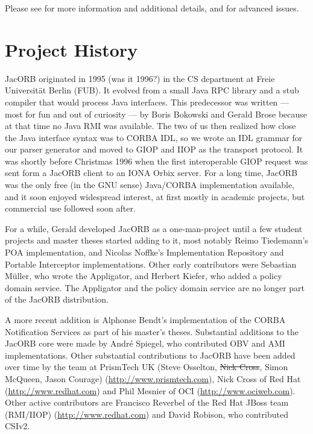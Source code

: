 Please see \cite{Brose2001a,Siegel2000, Vinoski1997} for more
information and additional details, and \cite{Henning1999} for
advanced issues.

\section{Project History}

JacORB originated in 1995 (was it 1996?) in the CS department at Freie
Universit{\"a}t Berlin (FUB). It evolved from a small Java RPC library and a
stub compiler that would process Java interfaces. This predecessor was
written --- most for fun and out of curiosity --- by Boris Bokowski
and Gerald Brose because at that time no Java RMI was available. The
two of us then realized how close the Java interface syntax was to
CORBA IDL, so we wrote an IDL grammar for our parser generator and
moved to GIOP and IIOP as the transport protocol. It was shortly
before Christmas 1996 when the first interoperable GIOP request was
sent form a JacORB client to an IONA Orbix server. For a long time,
JacORB was the only free (in the GNU sense) Java/CORBA implementation
available, and it soon enjoyed widespread interest, at first mostly in
academic projects, but commercial use followed soon after.

For a while, Gerald developed JacORB as a one-man-project until a few
student projects and master theses started adding to it, most notably
Reimo Tiedemann's POA implementation, and Nicolas Noffke's
Implementation Repository and Portable Interceptor implementations.
Other early contributors were Sebastian M{\"u}ller, who wrote the
Appligator, and Herbert Kiefer, who added a policy domain service. The
Appligator and the policy domain service are no longer part of the
JacORB distribution.

A more recent addition is Alphonse Bendt's implementation of the CORBA
Notification Services as part of his master's theses. Substantial additions to
the JacORB core were made by Andr{\'e} Spiegel, who contributed OBV and AMI
implementations. Other substantial contributions to JacORB have been added over
time by the team at PrismTech UK (Steve Osselton, \sout{Nick Cross}, Simon
McQueen, Jason Courage)
(\href{http://www.prismtech.com}{http://www.prismtech.com}), Nick Cross of Red
Hat (\href{http://www.redhat.com}{http://www.redhat.com}) and Phil Mesnier of
OCI (\href{http://www.ociweb.com}{http://www.ociweb.com}). Other active
contributors are Francisco Reverbel of the Red Hat JBoss team (RMI/IIOP)
(\href{http://www.redhat.com}{http://www.redhat.com}) and David Robison, who
contributed CSIv2.

